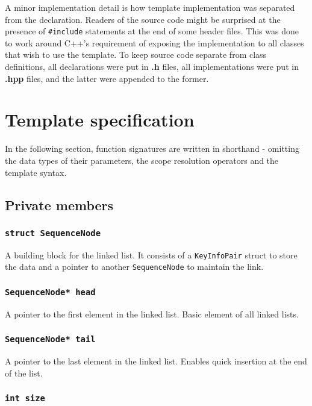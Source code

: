 ﻿\documentclass{article}
\begin{document}
A minor implementation detail is how template implementation was separated from
the declaration. Readers of the source code might be surprised at the presence
of {\tt \#include} statements at the end of some header files. This was done to
work around C++'s requirement of exposing the implementation to all classes that
wish to use the template. To keep source code separate from class definitions,
all declarations were put in {\bf .h} files, all implementations were put in
{\bf .hpp} files, and the latter were appended to the former.

\section{Template specification}

In the following section, function signatures are written in shorthand -
omitting the data types of their parameters, the scope resolution operators and
the template syntax.

\subsection{Private members}

\subsubsection{{\tt struct SequenceNode}}

A building block for the linked list. It consists of a {\tt KeyInfoPair} struct
to store the data and a pointer to another {\tt SequenceNode} to maintain the
link.

\subsubsection{{\tt SequenceNode* head}}

A pointer to the first element in the linked list. Basic element of all linked
lists.

\subsubsection{{\tt SequenceNode* tail}}

A pointer to the last element in the linked list. Enables quick insertion at the
end of the list.

\subsubsection{{\tt int size}}
\end{document}
